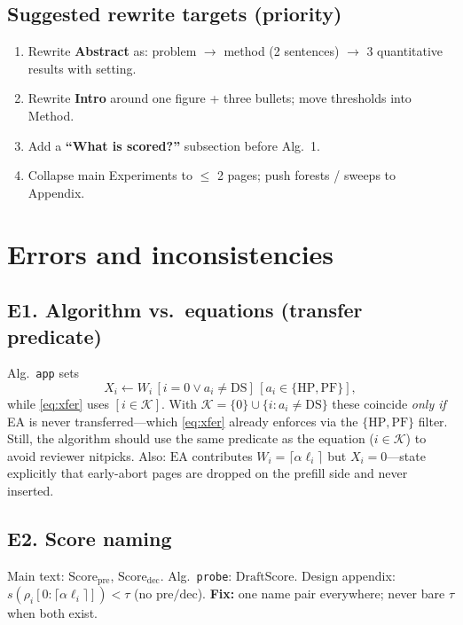 \documentclass[11pt]{article}
\newcommand{\Work}{W}
\newcommand{\Xfer}{X}
\newcommand{\Keep}{\mathcal{K}}
\begin{document}
\subsection{Suggested rewrite targets (priority)}
\begin{enumerate}
  \item Rewrite \textbf{Abstract} as: problem $\to$ method (2 sentences) $\to$
        3 quantitative results with setting.
  \item Rewrite \textbf{Intro} around one figure + three bullets; move
        thresholds into Method.
  \item Add a \textbf{``What is scored?''} subsection before Alg.~1.
  \item Collapse main Experiments to $\le$ 2 pages; push forests / sweeps to
        Appendix.
\end{enumerate}

\section{Errors and inconsistencies}

\subsection{E1. Algorithm vs.\ equations (transfer predicate)}
Alg.~\texttt{app} sets
\[
\Xfer_i \leftarrow \Work_i\,[i{=}0\lor a_i\neq\mathrm{DS}]\,[a_i\in\{\mathrm{HP},\mathrm{PF}\}],
\]
while \eqref{eq:xfer} uses $[i\in\Keep]$.
With $\Keep=\{0\}\cup\{i:a_i\neq\mathrm{DS}\}$ these coincide \emph{only if}
EA is never transferred---which \eqref{eq:xfer} already enforces via the
$\{\mathrm{HP},\mathrm{PF}\}$ filter. Still, the algorithm should use the same
predicate as the equation ($i\in\Keep$) to avoid reviewer nitpicks.
Also: $\mathrm{EA}$ contributes $\Work_i=\lceil\alpha\ell_i\rceil$ but
$\Xfer_i=0$---state explicitly that early-abort pages are dropped on the
prefill side and never inserted.

\subsection{E2. Score naming}
Main text: $\mathrm{Score}_{\mathrm{pre}}$, $\mathrm{Score}_{\mathrm{dec}}$.
Alg.~\texttt{probe}: $\mathrm{DraftScore}$.
Design appendix: $s(\rho_i[0{:}\lceil\alpha\ell_i\rceil])<\tau$ (no
$\mathrm{pre}/\mathrm{dec}$).
\textbf{Fix:} one name pair everywhere; never bare $\tau$ when both exist.
\end{document}

